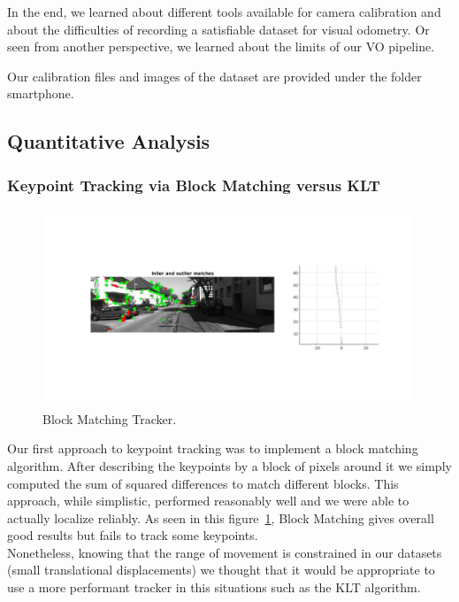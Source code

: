In the end, we learned about different tools available for camera calibration and about the difficulties of recording a satisfiable dataset
for visual odometry. Or seen from another perspective, we learned about the limits of our VO pipeline.

Our calibration files and images of the dataset are provided under the folder smartphone.

\subsection{Quantitative Analysis}
\subsubsection{Keypoint Tracking via Block Matching versus KLT}

\begin{figure}
  \includegraphics[width=0.99\textwidth]{files/block_tracker.jpg}
  \caption[Block Matching Tracker]{\label{f:block_tracker}Block Matching Tracker.}
\end{figure}

Our first approach to keypoint tracking was to implement a block matching algorithm. After describing the keypoints by a block of pixels around it we simply computed the sum of squared differences to match different blocks. This approach, while simplistic, performed reasonably well and we were able to actually localize reliably. As seen in this figure~\ref{f:block_tracker}, Block Matching gives overall good results but fails to track some keypoints. \\
Nonetheless, knowing that the range of movement is constrained in our datasets (small translational displacements) we thought that it would be appropriate to use a more performant tracker in this situations such as the KLT algorithm.

